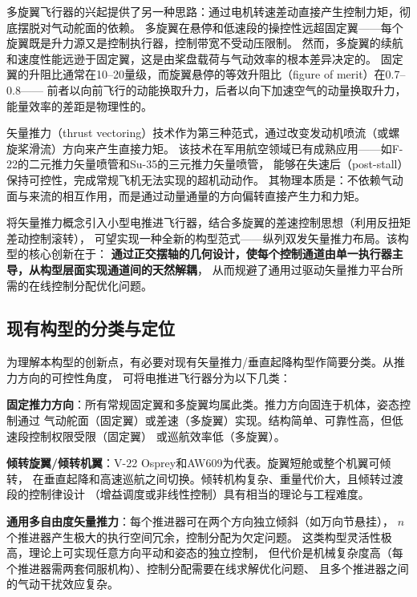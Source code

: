 \documentclass[a4paper,12pt]{ctexart}
\theoremstyle{plain}
\theoremstyle{definition}
\begin{document}
多旋翼飞行器的兴起提供了另一种思路：通过电机转速差动直接产生控制力矩，彻底摆脱对气动舵面的依赖\cite{mahony2012multirotor}。
多旋翼在悬停和低速段的操控性远超固定翼——每个旋翼既是升力源又是控制执行器，控制带宽不受动压限制。
然而，多旋翼的续航和速度性能远逊于固定翼，这是由桨盘载荷与气动效率的根本差异决定的。
固定翼的升阻比通常在10--20量级，而旋翼悬停的等效升阻比（figure of merit）在0.7--0.8——
前者以向前飞行的动能换取升力，后者以向下加速空气的动量换取升力，能量效率的差距是物理性的。

矢量推力（thrust vectoring）技术作为第三种范式，通过改变发动机喷流（或螺旋桨滑流）方向来产生直接力矩。
该技术在军用航空领域已有成熟应用——如F-22的二元推力矢量喷管和Su-35的三元推力矢量喷管，
能够在失速后（post-stall）保持可控性，完成常规飞机无法实现的超机动动作\cite{stevens2015aircraft}。
其物理本质是：不依赖气动面与来流的相互作用，而是通过动量通量的方向偏转直接产生力和力矩。

将矢量推力概念引入小型电推进飞行器，结合多旋翼的差速控制思想（利用反扭矩差动控制滚转），
可望实现一种全新的构型范式——纵列双发矢量推力布局。该构型的核心创新在于：
\textbf{通过正交摆轴的几何设计，使每个控制通道由单一执行器主导，从构型层面实现通道间的天然解耦}，
从而规避了通用过驱动矢量推力平台所需的在线控制分配优化问题\cite{johansen2013control}。

\subsection{现有构型的分类与定位}

为理解本构型的创新点，有必要对现有矢量推力/垂直起降构型作简要分类。从推力方向的可控性角度，
可将电推进飞行器分为以下几类：

\textbf{固定推力方向}：所有常规固定翼和多旋翼均属此类。推力方向固连于机体，姿态控制通过
气动舵面（固定翼）或差速（多旋翼）实现。结构简单、可靠性高，但低速段控制权限受限（固定翼）
或巡航效率低（多旋翼）。

\textbf{倾转旋翼/倾转机翼}：V-22 Osprey和AW609为代表。旋翼短舱或整个机翼可倾转，
在垂直起降和高速巡航之间切换。倾转机构复杂、重量代价大，且倾转过渡段的控制律设计
（增益调度或非线性控制）具有相当的理论与工程难度\cite{kang2009control}。

\textbf{通用多自由度矢量推力}：每个推进器可在两个方向独立倾斜（如万向节悬挂），
$n$个推进器产生极大的执行空间冗余，控制分配为欠定问题\cite{seguigasco2014novel}。
这类构型灵活性极高，理论上可实现任意方向平动和姿态的独立控制，
但代价是机械复杂度高（每个推进器需两套伺服机构）、控制分配需要在线求解优化问题、
且多个推进器之间的气动干扰效应复杂\cite{zhu2025experimental}。
\end{document}
